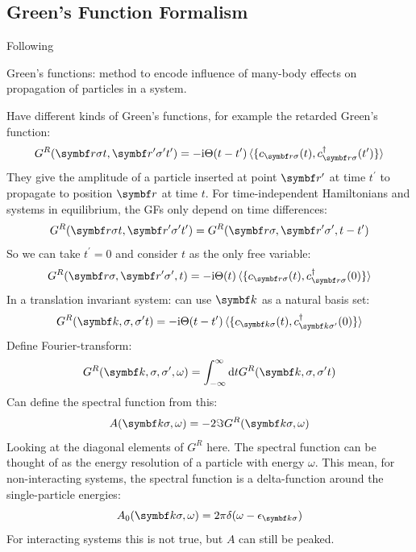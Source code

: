 \documentclass[../notes.tex]{subfiles}
\begin{document}
\subsection{Green's Function Formalism}

Following~\cite{bruusManyBodyQuantumTheory2004}

Green's functions: method to encode influence of many-body effects on propagation of particles in a system.

Have different kinds of Green's functions, for example the retarded Green's function:
\begin{equation}
	G^R (\vb{r}\sigma t, \vb{r}^{\prime} \sigma^{\prime} t^{\prime}) = -\iu \Theta(t- t^{\prime}) \braket{ \{c_{\vb{r} \sigma} (t), c_{\vb{r} \sigma}^{\dagger} (t^{\prime})\}}
\end{equation}
They give the amplitude of a particle inserted at point \(\vb{r}^{\prime}\) at time \(t^{\prime}\) to propagate to position \(\vb{r}\) at time \(t\).
For time-independent Hamiltonians and systems in equilibrium, the GFs only depend on time differences:
\begin{equation}
	G^R (\vb{r}\sigma t, \vb{r}^{\prime} \sigma^{\prime} t^{\prime}) = G^R (\vb{r} \sigma, \vb{r}^{\prime} \sigma^{\prime}, t - t^{\prime})
\end{equation}
So we can take \(t^{\prime} = 0\) and consider \(t\) as the only free variable:
\begin{equation}
	G^R (\vb{r}\sigma, \vb{r}^{\prime} \sigma^{\prime}, t) = -\iu \Theta(t) \braket{ \{c_{\vb{r} \sigma} (t), c_{\vb{r} \sigma}^{\dagger} (0)\}}
\end{equation}
In a translation invariant system: can use \(\vb{k}\) as a natural basis set:
\begin{equation}
	G^R (\vb{k}, \sigma, \sigma^{\prime} t) = -\iu \Theta(t- t^{\prime}) \braket{ \{c_{\vb{k} \sigma} (t), c_{\vb{k} \sigma^{\prime}}^{\dagger} (0)\}}
\end{equation}
Define Fourier-transform:
\begin{equation}
	G^R (\vb{k}, \sigma, \sigma^{\prime}, \omega) = \int_{-\infty}^{\infty} \odif{t} G^R (\vb{k}, \sigma, \sigma^{\prime} t)
\end{equation}
Can define the spectral function from this:
\begin{equation}
	A(\vb{k} \sigma, \omega) = -2 \Im G^R (\vb{k} \sigma, \omega)
\end{equation}
Looking at the diagonal elements of \(G^R\) here.
The spectral function can be thought of as the energy resolution of a particle with energy \(\omega\).
This mean, for non-interacting systems, the spectral function is a delta-function around the single-particle energies:
\begin{equation}
	A_0 (\vb{k} \sigma, \omega) = 2\pi \delta (\omega - \epsilon_{\vb{k} \sigma})
\end{equation}
For interacting systems this is not true, but \(A\) can still be peaked.
\end{document}
